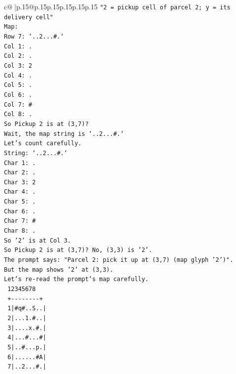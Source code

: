 \documentclass{article}
\begin{document}
{\begin{supertabular}{c@{$\;$}|p{.15\linewidth}@{}p{.15\linewidth}p{.15\linewidth}p{.15\linewidth}p{.15\linewidth}p{.15\linewidth}}
{{{\texttt{"2 = pickup cell of parcel 2; y = its delivery cell"} \\
\texttt{Map:} \\
\texttt{Row 7: `..2...\#.`} \\
\texttt{Col 1: .} \\
\texttt{Col 2: .} \\
\texttt{Col 3: 2} \\
\texttt{Col 4: .} \\
\texttt{Col 5: .} \\
\texttt{Col 6: .} \\
\texttt{Col 7: \#} \\
\texttt{Col 8: .} \\
\texttt{So Pickup 2 is at (3,7)?} \\
\texttt{Wait, the map string is `..2...\#.`} \\
\texttt{Let's count carefully.} \\
\texttt{String: `..2...\#.`} \\
\texttt{Char 1: .} \\
\texttt{Char 2: .} \\
\texttt{Char 3: 2} \\
\texttt{Char 4: .} \\
\texttt{Char 5: .} \\
\texttt{Char 6: .} \\
\texttt{Char 7: \#} \\
\texttt{Char 8: .} \\
\texttt{So '2' is at Col 3.} \\
\texttt{So Pickup 2 is at (3,7)? No, (3,3) is '2'.} \\
\texttt{The prompt says: "Parcel 2: pick it up at (3,7) (map glyph '2')".} \\
\texttt{But the map shows '2' at (3,3).} \\
\texttt{Let's re{-}read the prompt's map carefully.} \\
\texttt{   12345678} \\
\texttt{  +{-}{-}{-}{-}{-}{-}{-}{-}+} \\
\texttt{ 1|\#q\#..S..|} \\
\texttt{ 2|...1.\#..|} \\
\texttt{ 3|....x.\#.|} \\
\texttt{ 4|...\#...\#|} \\
\texttt{ 5|..\#...p.|} \\
\texttt{ 6|......\#A|} \\
\texttt{ 7|..2...\#.|} \\
}}}
\end{supertabular}}
\end{document}
